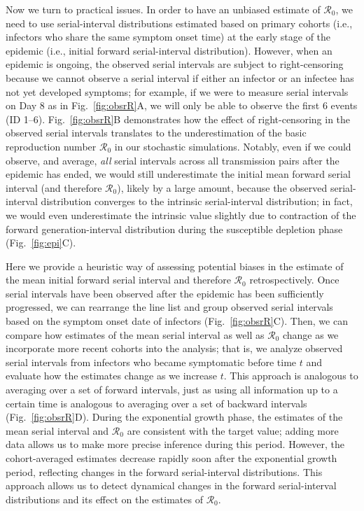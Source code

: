 \documentclass[12pt]{article}
\newcommand{\fref}[1]{Fig.~\ref{fig:#1}}
\newcommand{\Rx}[1]{\ensuremath{{\mathcal R}_{#1}}\xspace}
\newcommand{\Ro}{\Rx{0}}
\begin{document}
Now we turn to practical issues.
In order to have an unbiased estimate of \Ro, we need to use serial-interval distributions estimated based on primary cohorts (i.e., infectors who share the same symptom onset time) at the early stage of the epidemic (i.e., initial forward serial-interval distribution).
However, when an epidemic is ongoing, the observed serial intervals are subject to right-censoring because we cannot observe a serial interval if either an infector or an infectee has not yet developed symptoms;
for example, if we were to measure serial intervals on Day 8 as in \fref{obsrR}A, we will only be able to observe the first 6 events (ID 1--6).
\fref{obsrR}B demonstrates how the effect of right-censoring in the observed serial intervals translates to the underestimation of the basic reproduction number \Ro in our stochastic simulations.
Notably, even if we could observe, and average, \emph{all} serial intervals across all transmission pairs after the epidemic has ended, we would still underestimate the initial mean forward serial interval (and therefore \Ro), likely by a large amount, because the observed serial-interval distribution converges to the intrinsic serial-interval distribution;
in fact, we would even underestimate the intrinsic value slightly due to contraction of the forward generation-interval distribution during the susceptible depletion phase (\fref{epi}C).

Here we provide a heuristic way of assessing potential biases in the estimate of the mean initial forward serial interval and therefore \Ro retrospectively.
Once serial intervals have been observed after the epidemic has been sufficiently progressed, we can rearrange the line list and group observed serial intervals based on the symptom onset date of infectors (\fref{obsrR}C).
Then, we can compare how estimates of the mean serial interval as well as \Ro change as we incorporate more recent cohorts into the analysis;
that is, we analyze observed serial intervals from infectors who became symptomatic before time $t$ and evaluate how the estimates change as we increase $t$.
This approach is analogous to averaging over a set of forward intervals, just as using all information up to a certain time is analogous to averaging over a set of backward intervals (\fref{obsrR}D).
During the exponential growth phase, the estimates of the mean serial interval and \Ro are consistent with the target value;
adding more data allows us to make more precise inference during this period.
However, the cohort-averaged estimates decrease rapidly soon after the exponential growth period, reflecting changes in the forward serial-interval distributions.
This approach allows us to detect dynamical changes in the forward serial-interval distributions and its effect on the estimates of \Ro.
\end{document}
